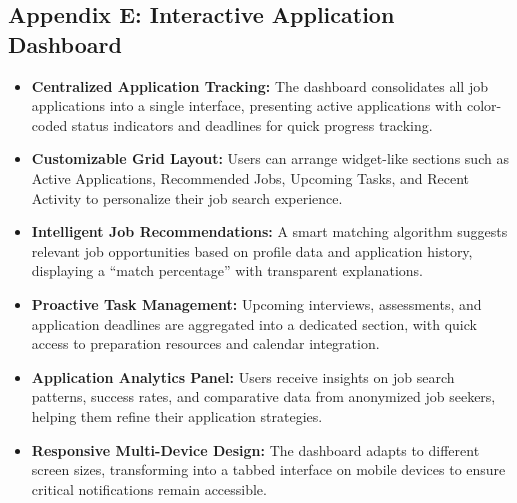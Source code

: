 \documentclass[
	letterpaper, %
]{jdf}
\begin{document}
\subsection{Appendix E: Interactive Application Dashboard}
\begin{itemize}
    \item \textbf{Centralized Application Tracking:} The dashboard consolidates all job applications into a single interface, presenting active applications with color-coded status indicators and deadlines for quick progress tracking.
    
    \item \textbf{Customizable Grid Layout:} Users can arrange widget-like sections such as Active Applications, Recommended Jobs, Upcoming Tasks, and Recent Activity to personalize their job search experience.
    
    \item \textbf{Intelligent Job Recommendations:} A smart matching algorithm suggests relevant job opportunities based on profile data and application history, displaying a “match percentage” with transparent explanations.
    
    \item \textbf{Proactive Task Management:} Upcoming interviews, assessments, and application deadlines are aggregated into a dedicated section, with quick access to preparation resources and calendar integration.
    
    \item \textbf{Application Analytics Panel:} Users receive insights on job search patterns, success rates, and comparative data from anonymized job seekers, helping them refine their application strategies.
    
    \item \textbf{Responsive Multi-Device Design:} The dashboard adapts to different screen sizes, transforming into a tabbed interface on mobile devices to ensure critical notifications remain accessible.
\end{itemize}

\hfill \break
\end{document}
